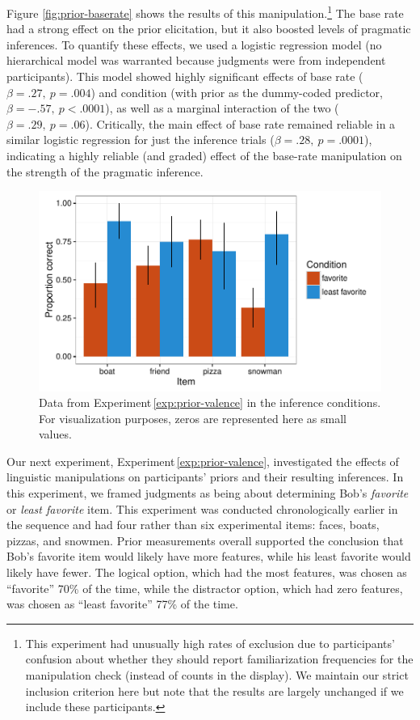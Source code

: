 \documentclass[man,noapacite]{apa2}
\newcounter{Experiment}
\newcommand{\exptref}[1]{Experiment\,\ref{#1}}
\begin{document}
Figure \ref{fig:prior-baserate} shows the results of this manipulation.\footnote{This experiment had unusually high rates of exclusion due to participants' confusion about whether they should report familiarization frequencies for the manipulation check (instead of counts in the display). We maintain our strict inclusion criterion here but note that the results are largely unchanged if we include these participants.}  The base rate had a strong effect on the prior elicitation, but it also boosted levels of pragmatic inferences. To quantify these effects, we used a logistic regression model (no hierarchical model was warranted because judgments were from independent participants). This model showed highly significant effects of base rate ($\beta = .27,~p = .004$) and condition (with prior as the dummy-coded predictor, $\beta = -.57,~p < .0001$), as well as a marginal interaction of the two  ($\beta = .29,~p = .06$). Critically, the main effect of base rate remained reliable in a similar logistic regression for just the inference trials ($\beta = .28,~p = .0001$), indicating a highly reliable (and graded) effect of the base-rate manipulation on the strength of the pragmatic inference.


\begin{figure}[t]
  \centering
  \includegraphics[width=6in]{../plots/2-prior-valence-items.pdf}
  \caption{\label{fig:prior-valence} Data from \exptref{exp:prior-valence} in the inference conditions. For visualization purposes, zeros are represented here as small values.}
\end{figure}

Our next experiment, \exptref{exp:prior-valence}, investigated the effects of linguistic manipulations on participants' priors and their resulting inferences. In this experiment, we framed judgments as being about determining Bob's \emph{favorite} or \emph{least favorite} item. This experiment was conducted chronologically earlier in the sequence and had four rather than six experimental items: faces, boats, pizzas, and snowmen. Prior measurements overall supported the conclusion that Bob's favorite item would likely have more features, while his least favorite would likely have fewer. The logical option, which had the most features, was chosen as ``favorite'' 70\% of the time, while the distractor option, which had zero features, was chosen as ``least favorite'' 77\% of the time.
\end{document}
